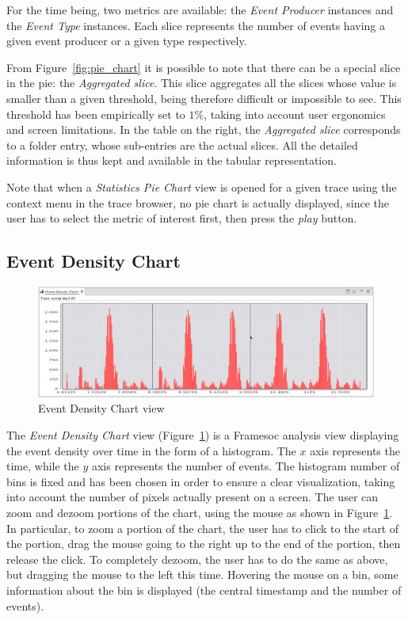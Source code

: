 \documentclass[twoside]{article}
\begin{document}
\begin{sloppypar}
For the time being, two metrics are available: the \emph{Event Producer} instances and the \emph{Event Type} instances. 
Each slice represents the number of events having a given event producer or a given type respectively.

From Figure~\ref{fig:pie_chart} it is possible to note that there can be a special slice in the pie: the \emph{Aggregated slice}.
This slice aggregates all the slices whose value is smaller than a given threshold, being therefore difficult or impossible to see.
This threshold has been empirically set to $1\%$, taking into account user ergonomics and screen limitations.
In the table on the right, the \emph{Aggregated slice} corresponds to a folder entry, whose sub-entries are the actual slices.
All the detailed information is thus kept and available in the tabular representation.

Note that when a \emph{Statistics Pie Chart} view is opened for a given trace using the context menu in the trace browser, no pie chart is actually displayed, since the user has to select the metric of interest first, then press the \emph{play} button.

\subsection{Event Density Chart}
\label{subsec:histogram}


\begin{figure}[h!]
  \centering
    \includegraphics[width=1.0\textwidth]{images/histogram_zoom.png}
  \caption{Event Density Chart view}
  \label{fig:histogram_zoom}
\end{figure}

The \emph{Event Density Chart} view (Figure~\ref{fig:histogram_zoom}) is a Framesoc analysis view displaying the event density over time in the form of a histogram.
The $x$ axis represents the time, while the $y$ axis represents the number of events.
The histogram number of bins is fixed and has been chosen in order to ensure a clear visualization, taking into account the number of pixels actually present on a screen. 
The user can zoom and dezoom portions of the chart, using the mouse as shown in Figure~\ref{fig:histogram_zoom}.
In particular, to zoom a portion of the chart, the user has to click to the start of the portion, drag the mouse going to the right up to the end of the portion, then release the click.
To completely dezoom, the user has to do the same as above, but dragging the mouse to the left this time.
Hovering the mouse on a bin, some information about the bin is displayed (the central timestamp and the number of events).


\end{sloppypar}
\end{document}
